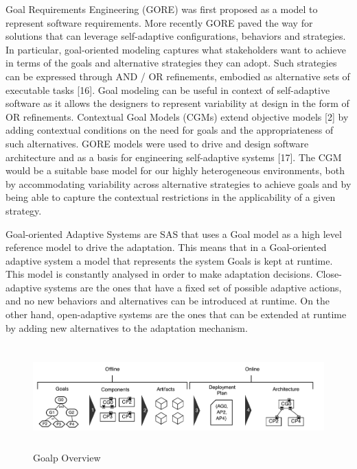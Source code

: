 \documentclass[conference]{IEEEtran}
\begin{document}
Goal Requirements Engineering (GORE) was first proposed as a model to represent software requirements. More recently GORE
paved the way for solutions that can leverage self-adaptive configurations, behaviors and strategies. In particular, goal-oriented modeling captures what stakeholders want to achieve in terms of the goals and alternative strategies they can adopt.  Such strategies can be expressed through AND / OR refinements, embodied as alternative sets of executable tasks [16]. Goal modeling can be useful in context of self-adaptive software as it allows the designers to represent variability at design in the form of OR refinements. Contextual Goal Models (CGMs) extend objective models [2] by adding contextual conditions on the need for goals and the appropriateness of such alternatives. GORE models were used to drive and design software architecture and as a basis for engineering self-adaptive systems [17]. The CGM would be a suitable base model for our highly heterogeneous environments, both by accommodating variability across alternative strategies to achieve goals and by being able to capture the contextual restrictions in the applicability of a given strategy.

Goal-oriented Adaptive Systems are SAS that uses a Goal model as a high level reference model to drive the adaptation. This means that in a Goal-oriented adaptive system a model that represents the system Goals is kept at runtime. This model is constantly analysed in order to make adaptation decisions. Close-adaptive systems are the ones that have a fixed set of possible adaptive actions, and no new behaviors and alternatives can be introduced at runtime. On the other hand, open-adaptive systems are the ones that can be extended at runtime by adding new alternatives to the adaptation mechanism.  

\begin{figure}[t]
\includegraphics[width=\textwidth,height=4cm]{images/transformations}
\caption{Goalp Overview \cite{rodrigues_goald:_2019} }
\label{fig:overview}
\end{figure}
\end{document}
